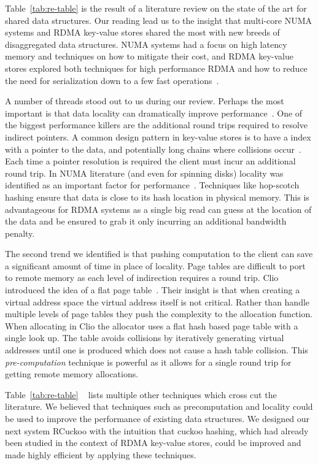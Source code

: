 \documentclass[12pt]{ucsddissertation}
\begin{document}
Table~\ref{tab:re-table} is the result of a literature review on the state of the art for shared
data structures. Our reading lead us to the insight that multi-core NUMA systems and RDMA key-value
stores shared the most with new breeds of disaggregated data structures. NUMA systems had a focus on
high latency memory and techniques on how to mitigate their cost, and RDMA key-value stores
explored both techniques for high performance RDMA and how to reduce the need for serialization down
to a few fast operations~\cite{cuckoo-improvements}.

A number of threads stood out to us during our review. Perhaps the most important is that data
locality can dramatically improve performance~\cite{farm}. One of the biggest performance killers
are the additional round trips required to resolve indirect pointers. A common design pattern in
key-value stores is to have a index with a pointer to the data, and potentially long chains where
collisions occur~\cite{race, clover}. Each time a pointer resolution is required the client must
incur an additional round trip. In NUMA literature (and even for spinning disks) locality was
identified as an important factor for performance~\cite{bbn,hopscotch}. Techniques like hop-scotch
hashing ensure that data is close to its hash location in physical memory. This is advantageous for
RDMA systems as a single big read can guess at the location of the data and be ensured to grab it
only incurring an additional bandwidth penalty.

The second trend we identified is that pushing computation to the client can save a significant
amount of time in place of locality. Page tables are difficult to port to remote memory as each
level of indirection requires a round trip. Clio introduced the idea of a flat page table~\cite{clio}. Their
insight is that when creating a virtual address space the virtual address itself is not critical.
Rather than handle multiple levels of page tables they push the complexity to the allocation
function. When allocating in Clio the allocator uses a flat hash based page table with a single look
up. The table avoids collisions by iteratively generating virtual addresses until one is produced
which does not cause a hash table collision. This \textit{pre-computation} technique is powerful as
it allows for a single round trip for getting remote memory allocations.

Table~\ref{tab:re-table} ~ lists multiple other techniques which cross
cut the literature. We believed that techniques such as precomputation and locality could be used to
improve the performance of existing data structures. We designed our next system RCuckoo with the
intuition that cuckoo hashing, which had already been studied in the context of RDMA key-value
stores, could be improved and made highly efficient by applying these techniques.
\end{document}
